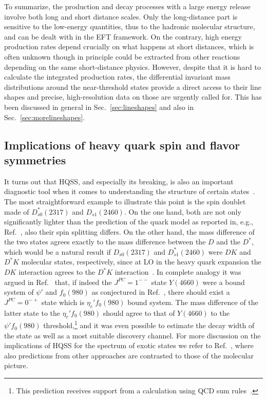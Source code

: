 To summarize, the production and decay processes with a large energy release
involve both long and short distance scales. Only the long-distance part is
sensitive to the low-energy quantities, thus to the hadronic molecular
structure, and can be dealt with in the EFT framework. On the contrary, high
energy production rates depend crucially on what happens at short distances,
which is often unknown though in principle could be extracted from other
reactions depending on the same short-distance physics.
However, despite that it is hard to calculate the integrated production rates,
the differential invariant mass distributions around the near-threshold states
provide a direct access to their line shapes and precise, high-resolution data
on those are urgently called for. This has been discussed in general in
Sec.~\ref{sec:lineshapes} and also in Sec.~\ref{sec:morelineshapes}.



\subsection{Implications of heavy quark spin and flavor symmetries}


It turns out that HQSS, and especially its breaking, is also an important
diagnostic tool when it comes to understanding the structure of certain
states~\cite{Cleven:2015era}. The most straightforward example to illustrate
this point is the spin doublet made of $D_{s0}^*(2317)$ and $D_{s1}(2460)$. On
the one hand, both are not only significantly lighter than the prediction of the
quark model as reported in, e.g., Ref.~\cite{DiPierro:2001dwf}, also their spin
splitting differs. On the other hand, the mass difference of the two states
agrees exactly to the mass difference between the $D$ and the $D^*$, which would
be a natural result if $D_{s0}(2317)$ and $D_{s1}^*(2460)$ were $DK$ and $D^*K$
molecular states, respectively, since at LO in the heavy quark expansion the
$DK$ interaction agrees to the $D^*K$ interaction~\cite{Kolomeitsev:2003ac}.
In complete analogy it was argued in Ref.~\cite{Guo:2009id} that, if indeed the
$J^{PC}=1^{--}$ state $Y(4660)$ were a bound system of $\psi'$ and $f_0(980)$ as
conjectured in Ref.~\cite{Guo:2008zg}, there should exist a $J^{PC}=0^{-+}$
state which is $\eta_c' f_0(980)$ bound system. The mass difference of the
latter state to the $\eta_c' f_0(980)$ should agree to that of $Y(4660)$ to the
$\psi' f_0(980)$ threshold,\footnote{This prediction receives support from a
calculation using QCD sum rules~\cite{Wang:2009cw}.} and it was even possible to
estimate the decay width of the state as well as a most suitable discovery channel.
For more discussion on the implications of HQSS for the spectrum of exotic
states we refer to Ref.~\cite{Cleven:2015era}, where also predictions from other
approaches are contrasted to those of the molecular picture.



